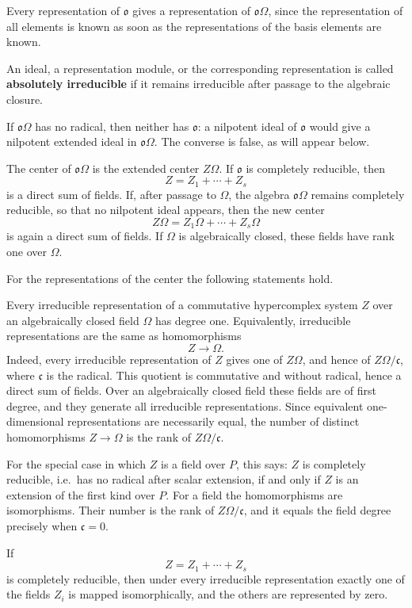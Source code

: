 \documentclass[11pt]{article}
\begin{document}
Every representation of \(\mathfrak{o}\) gives a representation of
\(\mathfrak{o}\Omega\), since the representation of all elements is
known as soon as the representations of the basis elements are known.

An ideal, a representation module, or the corresponding representation
is called \textbf{absolutely irreducible} if it remains irreducible
after passage to the algebraic closure.

If \(\mathfrak{o}\Omega\) has no radical, then neither has
\(\mathfrak{o}\): a nilpotent ideal of \(\mathfrak{o}\) would give a
nilpotent extended ideal in \(\mathfrak{o}\Omega\). The converse is
false, as will appear below.

The center of \(\mathfrak{o}\Omega\) is the extended center \(Z\Omega\).
If \(\mathfrak{o}\) is completely reducible, then \[
  Z=Z_1+\cdots+Z_s
\] is a direct sum of fields. If, after passage to \(\Omega\), the
algebra \(\mathfrak{o}\Omega\) remains completely reducible, so that no
nilpotent ideal appears, then the new center \[
  Z\Omega=Z_1\Omega+\cdots+Z_s\Omega
\] is again a direct sum of fields. If \(\Omega\) is algebraically
closed, these fields have rank one over \(\Omega\).

For the representations of the center the following statements hold.

Every irreducible representation of a commutative hypercomplex system
\(Z\) over an algebraically closed field \(\Omega\) has degree one.
Equivalently, irreducible representations are the same as homomorphisms
\[
  Z\to\Omega.
\] Indeed, every irreducible representation of \(Z\) gives one of
\(Z\Omega\), and hence of \(Z\Omega/\mathfrak c\), where \(\mathfrak c\)
is the radical. This quotient is commutative and without radical, hence
a direct sum of fields. Over an algebraically closed field these fields
are of first degree, and they generate all irreducible representations.
Since equivalent one-dimensional representations are necessarily equal,
the number of distinct homomorphisms \(Z\to\Omega\) is the rank of
\(Z\Omega/\mathfrak c\).

For the special case in which \(Z\) is a field over \(P\), this says:
\(Z\) is completely reducible, i.e.~has no radical after scalar
extension, if and only if \(Z\) is an extension of the first kind over
\(P\). For a field the homomorphisms are isomorphisms. Their number is
the rank of \(Z\Omega/\mathfrak c\), and it equals the field degree
precisely when \(\mathfrak c=0\).

If \[
  Z=Z_1+\cdots+Z_s
\] is completely reducible, then under every irreducible representation
exactly one of the fields \(Z_i\) is mapped isomorphically, and the
others are represented by zero.
\end{document}
